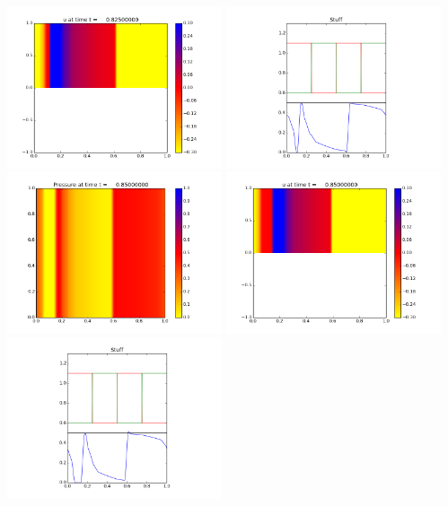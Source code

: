 \documentclass[11pt]{article}
\begin{document}
\includegraphics[width=0.475\textwidth]{frame0033fig1.png}
\vskip 10pt 
\includegraphics[width=0.475\textwidth]{frame0033fig3.png}
\vskip 10pt 
\includegraphics[width=0.475\textwidth]{frame0034fig0.png}
\includegraphics[width=0.475\textwidth]{frame0034fig1.png}
\vskip 10pt 
\includegraphics[width=0.475\textwidth]{frame0034fig3.png}
\end{document}
